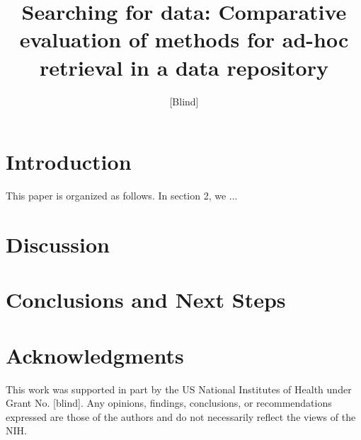 \documentclass{sig-alternate}
\begin{document}
\sloppy
{}

\author{[Blind]}

\title{Searching for data: Comparative evaluation of methods for ad-hoc retrieval in a data repository}

\maketitle
\begin{abstract}

\end{abstract}



\section{Introduction}
 
This paper is organized as follows. In section 2, we ...

\section{Discussion}


\section{Conclusions and Next Steps}



\section{Acknowledgments}
This work was supported in part by the US National Institutes of Health under Grant No. [blind]. Any opinions, findings, conclusions, or recommendations expressed are those of the authors and do not necessarily reflect the views of the NIH.


  
\end{document}
